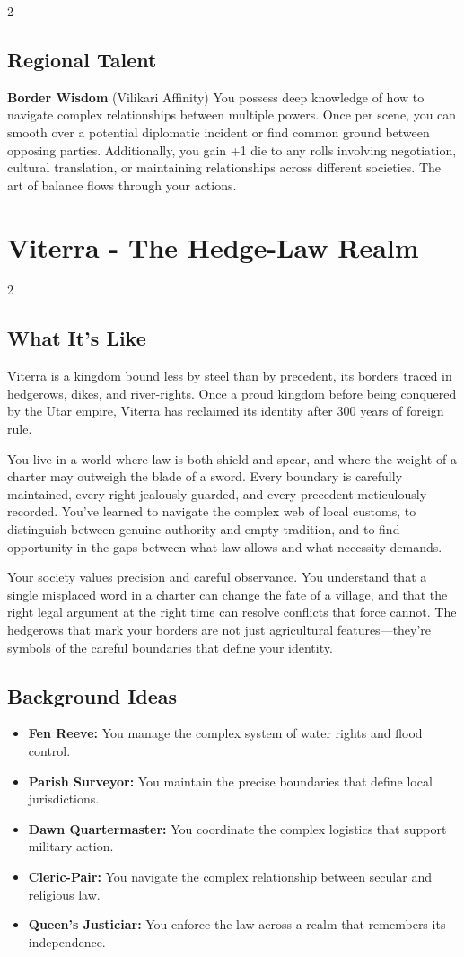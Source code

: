 \documentclass[11pt]{article}
\newcommand{\region}[1]{\section*{#1}}
\newcommand{\subregion}[1]{\subsection*{#1}}
\begin{document}
\begin{multicols}{2}
\subregion{Regional Talent}

\textbf{Border Wisdom} (Vilikari Affinity)
You possess deep knowledge of how to navigate complex relationships between multiple powers. Once per scene, you can smooth over a potential diplomatic incident or find common ground between opposing parties. Additionally, you gain +1 die to any rolls involving negotiation, cultural translation, or maintaining relationships across different societies. The art of balance flows through your actions.

\end{multicols}

\region{Viterra - The Hedge-Law Realm}

\begin{multicols}{2}
\subregion{What It's Like}

Viterra is a kingdom bound less by steel than by precedent, its borders traced in hedgerows, dikes, and river-rights. Once a proud kingdom before being conquered by the Utar empire, Viterra has reclaimed its identity after 300 years of foreign rule.

You live in a world where law is both shield and spear, and where the weight of a charter may outweigh the blade of a sword. Every boundary is carefully maintained, every right jealously guarded, and every precedent meticulously recorded. You've learned to navigate the complex web of local customs, to distinguish between genuine authority and empty tradition, and to find opportunity in the gaps between what law allows and what necessity demands.

Your society values precision and careful observance. You understand that a single misplaced word in a charter can change the fate of a village, and that the right legal argument at the right time can resolve conflicts that force cannot. The hedgerows that mark your borders are not just agricultural features---they're symbols of the careful boundaries that define your identity.

\columnbreak

\subregion{Background Ideas}

\begin{itemize}[leftmargin=*]
    \item \textbf{Fen Reeve:} You manage the complex system of water rights and flood control.
    \item \textbf{Parish Surveyor:} You maintain the precise boundaries that define local jurisdictions.
    \item \textbf{Dawn Quartermaster:} You coordinate the complex logistics that support military action.
    \item \textbf{Cleric-Pair:} You navigate the complex relationship between secular and religious law.
    \item \textbf{Queen's Justiciar:} You enforce the law across a realm that remembers its independence.
\end{itemize}


\end{multicols}
\end{document}
